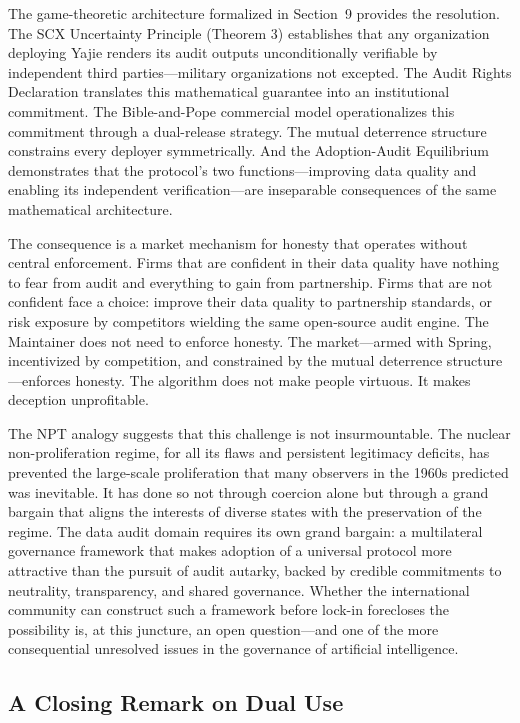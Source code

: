 \documentclass[12pt,a4paper]{article}
\theoremstyle{definition}
\theoremstyle{remark}
\begin{document}
The game-theoretic architecture formalized in Section~9 provides the resolution. The SCX Uncertainty Principle (Theorem 3) establishes that any organization deploying Yajie renders its audit outputs unconditionally verifiable by independent third parties—military organizations not excepted. The Audit Rights Declaration translates this mathematical guarantee into an institutional commitment. The Bible-and-Pope commercial model operationalizes this commitment through a dual-release strategy. The mutual deterrence structure constrains every deployer symmetrically. And the Adoption-Audit Equilibrium demonstrates that the protocol's two functions—improving data quality and enabling its independent verification—are inseparable consequences of the same mathematical architecture.

The consequence is a market mechanism for honesty that operates without central enforcement. Firms that are confident in their data quality have nothing to fear from audit and everything to gain from partnership. Firms that are not confident face a choice: improve their data quality to partnership standards, or risk exposure by competitors wielding the same open-source audit engine. The Maintainer does not need to enforce honesty. The market—armed with Spring, incentivized by competition, and constrained by the mutual deterrence structure—enforces honesty. The algorithm does not make people virtuous. It makes deception unprofitable.

The NPT analogy suggests that this challenge is not insurmountable. The nuclear non-proliferation regime, for all its flaws and persistent legitimacy deficits, has prevented the large-scale proliferation that many observers in the 1960s predicted was inevitable. It has done so not through coercion alone but through a grand bargain that aligns the interests of diverse states with the preservation of the regime. The data audit domain requires its own grand bargain: a multilateral governance framework that makes adoption of a universal protocol more attractive than the pursuit of audit autarky, backed by credible commitments to neutrality, transparency, and shared governance. Whether the international community can construct such a framework before lock-in forecloses the possibility is, at this juncture, an open question—and one of the more consequential unresolved issues in the governance of artificial intelligence.

\subsection{A Closing Remark on Dual Use}
\end{document}
